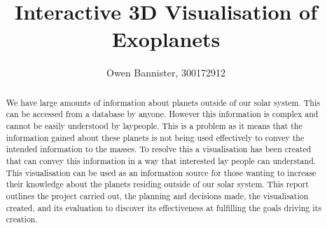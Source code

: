 \documentclass[11pt
              , a4paper
              , twoside
              , openright
              ]{report}
\title{Interactive 3D Visualisation of Exoplanets}
\author{Owen Bannister, 300172912}
\date{}
\begin{document}
\frontmatter



\begin{abstract}


We have large amounts of information about planets outside of our solar system.
This can be accessed from a database by anyone. However this information is
complex and cannot be easily understood by laypeople. This is a problem as it
means that the information gained about these planets is not being used
effectively to convey the intended information to the masses. To resolve this a
visualisation has been created that can convey this information in a way that
interested lay people can understand. This visualisation can be used as an
information source for those wanting to increase their knowledge about the
planets residing outside of our solar system. This report outlines the project
carried out, the planning and decisions made, the visualisation created, and its
evaluation to discover its effectiveness at fulfilling the goals driving its
creation.


\end{abstract}


\maketitle



\tableofcontents



\mainmatter













\backmatter

 

%
%
%
\end{document}
